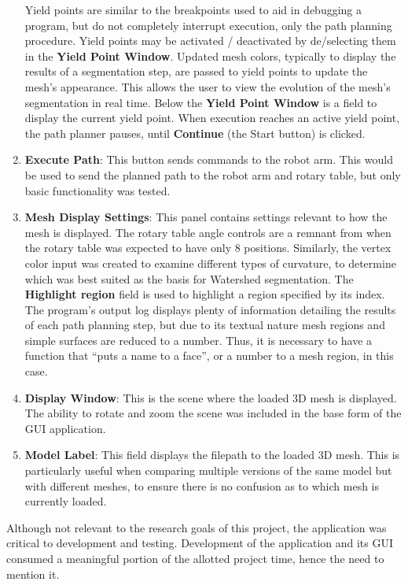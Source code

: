 \begin{enumerate}
		Yield points are similar to the breakpoints used to aid in debugging a program, but do not completely interrupt execution, only the path planning procedure.
		Yield points may be activated / deactivated by de/selecting them in the \textbf{Yield Point Window}.
		Updated mesh colors, typically to display the results of a segmentation step, are passed to yield points to update the mesh's appearance.
		This allows the user to view the evolution of the mesh's segmentation in real time.
		Below the \textbf{Yield Point Window} is a field to display the current yield point.
		When execution reaches an active yield point, the path planner pauses, until \textbf{Continue} (the Start button) is clicked.
	\item \textbf{Execute Path}: This button sends commands to the robot arm.
		This would be used to send the planned path to the robot arm and rotary table, but only basic functionality was tested.
	\item \textbf{Mesh Display Settings}: This panel contains settings relevant to how the mesh is displayed.
		The rotary table angle controls are a remnant from when the rotary table was expected to have only 8 positions.
		Similarly, the vertex color input was created to examine different types of curvature, to determine which was best suited as the basis for Watershed segmentation.
		The \textbf{Highlight region} field is used to highlight a region specified by its index.
		The program's output log displays plenty of information detailing the results of each path planning step, but due to its textual nature mesh regions and simple surfaces are reduced to a number.
		Thus, it is necessary to have a function that ``puts a name to a face'', or a number to a mesh region, in this case.
	\item \textbf{Display Window}: This is the scene where the loaded 3D mesh is displayed.
		The ability to rotate and zoom the scene was included in the base form of the GUI application.
	\item \textbf{Model Label}: This field displays the filepath to the loaded 3D mesh.
		This is particularly useful when comparing multiple versions of the same model but with different meshes, to ensure there is no confusion as to which mesh is currently loaded.
\end{enumerate}

Although not relevant to the research goals of this project, the application was critical to development and testing.
Development of the application and its GUI consumed a meaningful portion of the allotted project time, hence the need to mention it.

